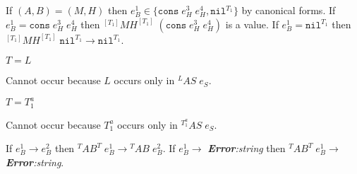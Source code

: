 \begin{case}
\begin{subcase}
If $(A,B)=(M,H)$ then $e_{B}^{1}\in\lbrace\mathtt{cons}\;e_{H}^{3}\;e_{H}^{4},\mathtt{nil}^{T_{1}}\rbrace$ by canonical forms.  If $e_{B}^{1}=\mathtt{cons}\;e_{H}^{3}\;e_{H}^{4}$ then $^{[T_{1}]}MH^{[T_{1}]}\;(\mathtt{cons}\;e_{H}^{3}\;e_{H}^{4})$ is a value.  If $e_{B}^{1}=\mathtt{nil}^{T_{1}}$ then $^{[T_{1}]}MH^{[T_{1}]}\;\mathtt{nil}^{T_{1}}\rightarrow\mathtt{nil}^{T_{1}}$.
\end{subcase}
\begin{subcase}
$T=L$

Cannot occur because $L$ occurs only in $^{L}AS\;e_{S}$.
\end{subcase}
\begin{subcase}
$T=T_{1}^{a}$

Cannot occur because $T_{1}^{a}$ occurs only in $^{T_{1}^{a}}AS\;e_{S}$.
\end{subcase}
If $e_{B}^{1}\rightarrow e_{B}^{2}$ then $^{T}AB^{T}\;e_{B}^{1}\rightarrow{^{T}A}B\;e_{B}^{2}$.  If $e_{B}^{1}\rightarrow$ \emph{\textbf{Error}:\;string} then $^{T}AB^{T}\;e_{B}^{1}\rightarrow$ \emph{\textbf{Error}:\;string}.
\end{case}